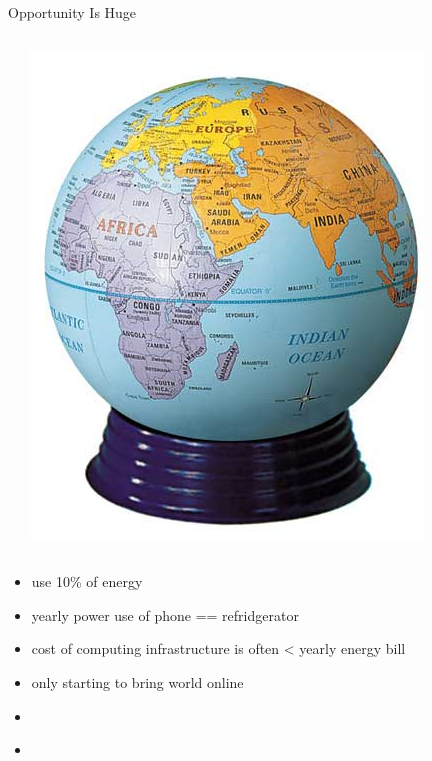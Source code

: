 \documentclass[xcolor=pdflatex,dvipsnames,table]{beamer}
\begin{document}
\begin{frame}[fragile]{Opportunity Is Huge}
\begin{columns}
\begin{center}
\end{center}
\begin{center}
\includegraphics[height=0.3\textheight]{figs/globe.jpg} 
\end{center}
\end{columns}
\vspace{0.5cm}
\begin{itemize}
\item use 10\% of energy
\item yearly power use of phone == refridgerator
\item cost of computing infrastructure is often < yearly energy bill
\item only starting to bring world online \\[0.5cm]
\item \color{red}{energy is starting to dominate everything!!!} \\[0.25cm]
\item \color{red}{digital designs yield 100-1000x win in efficiency} \\[0.5cm]
\end{itemize}
\end{frame}
\end{document}

